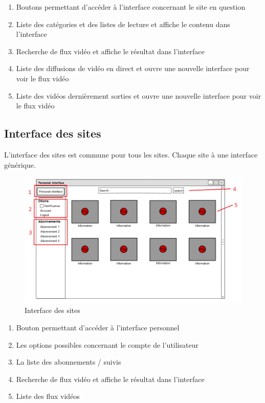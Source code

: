 \documentclass[11pt]{report} %
\begin{document}
			\begin{enumerate}
				\item Boutons permettant d'accéder à l'interface concernant le site en question
				\item Liste des catégories et des listes de lecture et affiche le contenu dans l'interface
				\item Recherche de flux vidéo et affiche le résultat dans l'interface
				\item Liste des diffusions de vidéo en direct et ouvre une nouvelle interface pour voir le flux vidéo
				\item Liste des vidéos dernièrement sorties et ouvre une nouvelle interface pour voir le flux vidéo
			\end{enumerate}
		
		\newpage		
		
		\subsection{Interface des sites}
		L'interface des sites est commune pour tous les sites. Chaque site à une interface générique. 
		\begin{figure}[h]
			\center
			\includegraphics[width=1\textwidth]{../img/serviceInterfacenum.png}
			\caption{Interface des sites}
			\label{interfacesites}
		\end{figure}
		
		\begin{enumerate}
			\item Bouton permettant d'accéder à l'interface personnel
			\item Les options possibles concernant le compte de l'utilisateur
			\item La liste des abonnements / suivis 
			\item Recherche de flux vidéo et affiche le résultat dans l'interface
			\item Liste des flux vidéos
		\end{enumerate}
\end{document}
